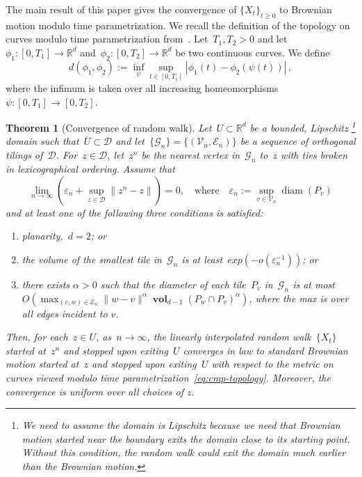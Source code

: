 \documentclass[12pt]{amsart}
\numberwithin{equation}{section}
\DeclareMathOperator{\diam}{{\mathop{diam}}}
\newtheorem{theoremA}{Theorem}[section]
\newcommand*{\Rd}{\ensuremath{\mathbb{R}^d}}
\newcommand{\G}{\mathcal{G}}
\newcommand{\V}{\mathcal{V}}
\newcommand{\E}{\mathcal{E}}
\newcommand{\eps}{\varepsilon}
\DeclareMathOperator{\vol}{\mathbf{vol}}
\begin{document}
The main result of this paper gives the convergence of $\{X_t\}_{t\geq 0}$ to Brownian motion modulo time parametrization. 
We recall the definition of the topology on curves modulo time parametrization from~\cite[Section 2]{AB1999}.
Let~$T_1,T_2 > 0$ and let~$\phi_1: [0,T_1] \to \Rd$ and~$\phi_2:[0,T_2] \to \Rd$ be two continuous 
curves. We define 
\begin{equation}
	\label{eq:cmp-topology}
	d(\phi_1, \phi_2) := \inf_{\psi} \sup_{t \in [0,T_1]} | \phi_1(t) - \phi_2(\psi(t))| \, , 
\end{equation}
where the infimum is taken over all increasing homeomorphisms~$\psi:[0,T_1] \to [0,T_2]$. 




\begin{theoremA}[Convergence of random walk] \label{theorem:convergence-of-rw-trace}
	Let~$U \subset \Rd$ be a bounded, Lipschitz \footnote{We need to assume the domain is Lipschitz because we need that Brownian motion started near the boundary exits the domain close to its starting point. Without this condition, the random walk could exit the domain much earlier than the Brownian motion.} domain such that~$\overline{U}\subset \mathcal{D}$ and let~$\{\G_n\} = \{(\V_n, \E_n)\}$ 	be a sequence of orthogonal tilings of~$\mathcal{D}$. For~$z \in \mathcal{D}$, let~$z^{n}$ be the nearest
	vertex in~$\G_n$ to~$z$ with ties broken in lexicographical ordering. Assume that  
	\begin{equation}
		\label{eq:smallness}
	 \lim_{n \to \infty} \left( \eps_n + \sup_{z \in \mathcal{D}} \|z^{n} - z\| \right) = 0  , \quad \text{where} \quad
	 \eps_n := \sup_{v \in \V_n} \diam(P_v)  
	\end{equation}
	and at least one of the following three conditions is satisfied:
	\begin{enumerate}[label = (\Roman*)]
		\item planarity,~$d = 2$; or \label{item:planarity}
		\item the volume of the smallest tile in~$\G_n$ is at least~$exp( -o(\eps_n^{-1}))$; or \label{item:vol}
		\item there exists $\alpha> 0$ such that the diameter of each tile~$P_v$ in~$\G_n$ is at most \\ $O(\max_{(v,w) \in \E_n} \|w-v\|^{\alpha} \vol_{d-1}(P_w \cap P_v)^{\alpha})$, where the max is over all edges incident to $v$. 
		  \label{item:diam}
	\end{enumerate}
	Then, for each~$z \in U$, as~$n \to \infty$, the linearly interpolated random walk~$\{X_t\}$
	started at~$z^{n}$ and stopped upon exiting~$U$ 
	converges in law to standard Brownian motion started at~$z$ and stopped upon exiting~$U$ with respect to the metric on curves viewed modulo time parametrization~\eqref{eq:cmp-topology}. Moreover, the convergence is uniform over all choices of $z$.
\end{theoremA}
\end{document}
